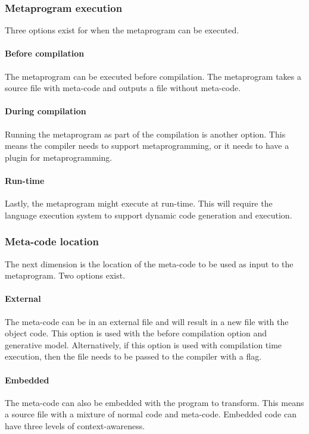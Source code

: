 \subsubsection{Metaprogram execution}
Three options exist for when the metaprogram can be executed.

\paragraph{Before compilation}
The metaprogram can be executed before compilation.
The metaprogram takes a source file with meta-code and outputs a file without meta-code.

\paragraph{During compilation}
Running the metaprogram as part of the compilation is another option.
This means the compiler needs to support metaprogramming, or it needs to have a plugin for metaprogramming.

\paragraph{Run-time}
Lastly, the metaprogram might execute at run-time.
This will require the language execution system to support dynamic code generation and execution.

\subsubsection{Meta-code location}
The next dimension is the location of the meta-code to be used as input to the metaprogram.
Two options exist.

\paragraph{External}
The meta-code can be in an external file and will result in a new file with the object code.
This option is used with the before compilation option and generative model.
Alternatively, if this option is used with compilation time execution, then the file needs to be passed to the compiler with a flag.

\paragraph{Embedded}
The meta-code can also be embedded with the program to transform.
This means a source file with a mixture of normal code and meta-code.
Embedded code can have three levels of context-awareness.


